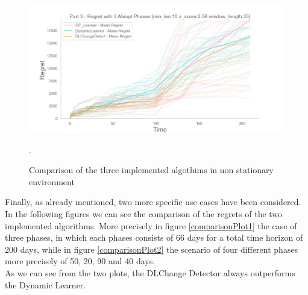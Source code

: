 \begin{figure}[!htb]
	\centering
		\includegraphics[width=\textwidth]{images/CompleteThreeDifferentPhases.jpeg}
	\caption{Comparison of the three implemented algothims in non stationary environment}.
	\label{regretPart3CompleteFig}
\end{figure}

Finally, as already mentioned, two more specific use cases have been considered. In the following figures we can see the comparison of the regrets of the two implemented algorithms. More precisely in figure \ref{comparisonPlot1} the case of three phases, in which each phases consists of 66 days for a total time horizon of 200 days, while in figure \ref{comparisonPlot2} the scenario of four different phases more precisely of 50, 20, 90 and 40 days.\\ As we can see from the two plots, the DLChange Detector always outperforms the Dynamic Learner.

